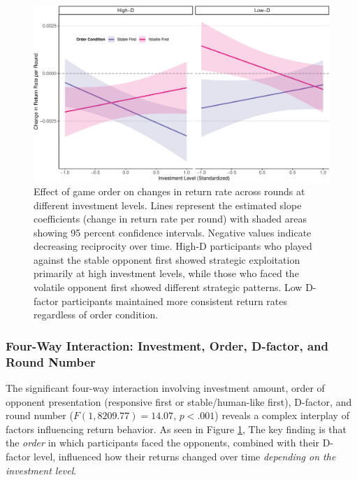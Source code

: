 \documentclass[
]{article}
\begin{document}
\begin{figure}[H]

{\centering \includegraphics[width=\textwidth]{article_files/figure-latex/orderEffectPlot-1} 

}

\caption{Effect of game order on changes in return rate across rounds at different investment levels. Lines represent the estimated slope coefficients (change in return rate per round) with shaded areas showing 95 percent confidence intervals. Negative values indicate decreasing reciprocity over time. High-D participants who played against the stable opponent first showed strategic exploitation primarily at high investment levels, while those who faced the volatile opponent first showed different strategic patterns. Low D-factor participants maintained more consistent return rates regardless of order condition.}\label{fig:orderEffectPlot}
\end{figure}

\subsubsection{Four-Way Interaction: Investment, Order, D-factor, and Round Number}\label{four-way-interaction-investment-order-d-factor-and-round-number}

The significant four-way interaction involving investment amount, order of opponent presentation (responsive first or stable/human-like first), D-factor, and round number (\(F(1, 8209.77) = 14.07\), \(p < .001\)) reveals a complex interplay of factors influencing return behavior. As seen in Figure \ref{fig:orderEffectPlot}, The key finding is that the \emph{order} in which participants faced the opponents, combined with their D-factor level, influenced how their returns changed over time \emph{depending on the investment level}.
\end{document}
